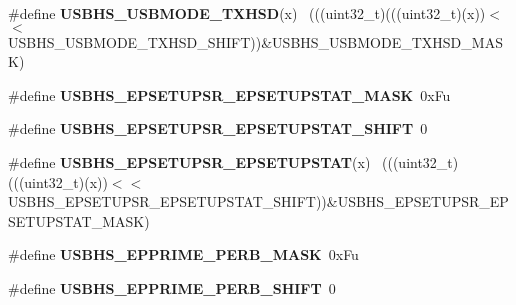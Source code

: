 \begin{DoxyCompactItemize}
\item 
\hypertarget{group___u_s_b_h_s___register___masks_ga4a111dcdfc244bc6f4d97d7a14458259}{}\#define {\bfseries U\+S\+B\+H\+S\+\_\+\+U\+S\+B\+M\+O\+D\+E\+\_\+\+T\+X\+H\+S\+D}(x)                                  ~(((uint32\+\_\+t)(((uint32\+\_\+t)(x))$<$$<$U\+S\+B\+H\+S\+\_\+\+U\+S\+B\+M\+O\+D\+E\+\_\+\+T\+X\+H\+S\+D\+\_\+\+S\+H\+I\+F\+T))\&U\+S\+B\+H\+S\+\_\+\+U\+S\+B\+M\+O\+D\+E\+\_\+\+T\+X\+H\+S\+D\+\_\+\+M\+A\+S\+K)\label{group___u_s_b_h_s___register___masks_ga4a111dcdfc244bc6f4d97d7a14458259}

\item 
\hypertarget{group___u_s_b_h_s___register___masks_ga21594605f8e2a8fd943fe3ec1b997ca7}{}\#define {\bfseries U\+S\+B\+H\+S\+\_\+\+E\+P\+S\+E\+T\+U\+P\+S\+R\+\_\+\+E\+P\+S\+E\+T\+U\+P\+S\+T\+A\+T\+\_\+\+M\+A\+S\+K}~0x\+Fu\label{group___u_s_b_h_s___register___masks_ga21594605f8e2a8fd943fe3ec1b997ca7}

\item 
\hypertarget{group___u_s_b_h_s___register___masks_gaf76b64284d4e42a2d340e9d7ce4ea949}{}\#define {\bfseries U\+S\+B\+H\+S\+\_\+\+E\+P\+S\+E\+T\+U\+P\+S\+R\+\_\+\+E\+P\+S\+E\+T\+U\+P\+S\+T\+A\+T\+\_\+\+S\+H\+I\+F\+T}~0\label{group___u_s_b_h_s___register___masks_gaf76b64284d4e42a2d340e9d7ce4ea949}

\item 
\hypertarget{group___u_s_b_h_s___register___masks_gaf1ca831184eb56dc26f7d813e1698430}{}\#define {\bfseries U\+S\+B\+H\+S\+\_\+\+E\+P\+S\+E\+T\+U\+P\+S\+R\+\_\+\+E\+P\+S\+E\+T\+U\+P\+S\+T\+A\+T}(x)                  ~(((uint32\+\_\+t)(((uint32\+\_\+t)(x))$<$$<$U\+S\+B\+H\+S\+\_\+\+E\+P\+S\+E\+T\+U\+P\+S\+R\+\_\+\+E\+P\+S\+E\+T\+U\+P\+S\+T\+A\+T\+\_\+\+S\+H\+I\+F\+T))\&U\+S\+B\+H\+S\+\_\+\+E\+P\+S\+E\+T\+U\+P\+S\+R\+\_\+\+E\+P\+S\+E\+T\+U\+P\+S\+T\+A\+T\+\_\+\+M\+A\+S\+K)\label{group___u_s_b_h_s___register___masks_gaf1ca831184eb56dc26f7d813e1698430}

\item 
\hypertarget{group___u_s_b_h_s___register___masks_ga00d74f7043a2608e8e456a6bccd48470}{}\#define {\bfseries U\+S\+B\+H\+S\+\_\+\+E\+P\+P\+R\+I\+M\+E\+\_\+\+P\+E\+R\+B\+\_\+\+M\+A\+S\+K}~0x\+Fu\label{group___u_s_b_h_s___register___masks_ga00d74f7043a2608e8e456a6bccd48470}

\item 
\hypertarget{group___u_s_b_h_s___register___masks_gad35b3a8615fbdf215154ba79a961176c}{}\#define {\bfseries U\+S\+B\+H\+S\+\_\+\+E\+P\+P\+R\+I\+M\+E\+\_\+\+P\+E\+R\+B\+\_\+\+S\+H\+I\+F\+T}~0\label{group___u_s_b_h_s___register___masks_gad35b3a8615fbdf215154ba79a961176c}


\end{DoxyCompactItemize}
